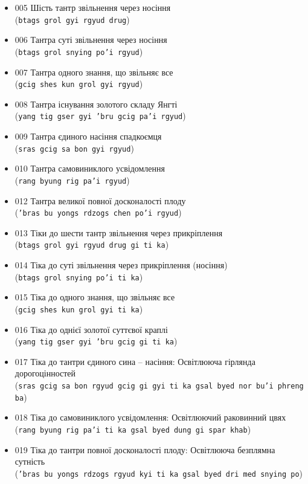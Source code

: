 \documentclass{article}
\begin{document}
\begingroup\raggedright
\begin{itemize}
\item 005 Шість тантр звільнення через носіння \\ (\texttt{btags grol gyi rgyud drug})
\item 006 Тантра суті звільнення через носіння \\ (\texttt{btags grol snying po'i rgyud})
\item 007 Тантра одного знання, що звільняє все \\ (\texttt{gcig shes kun grol gyi rgyud})
\item 008 Тантра існування золотого складу Янгті \\ (\texttt{yang tig gser gyi 'bru gcig pa'i rgyud})
\item 009 Тантра єдиного насіння спадкоємця \\ (\texttt{sras gcig sa bon gyi rgyud})
\item 010 Тантра самовиниклого усвідомлення \\ (\texttt{rang byung rig pa'i rgyud})
\item 012 Тантра великої повної досконалості плоду \\ (\texttt{'bras bu yongs rdzogs chen po'i rgyud})
\item 013 Тіки до шести тантр звільнення через прикріплення \\ (\texttt{btags grol gyi rgyud drug gi ti ka})
\item 014 Тіка до суті звільнення через прикріплення (носіння) \\ (\texttt{btags grol snying po'i ti ka})
\item 015 Тіка до одного знання, що звільняє все \\ (\texttt{gcig shes kun grol gyi ti ka})
\item 016 Тіка до однієї золотої суттєвої краплі \\ (\texttt{yang tig gser gyi 'bru gcig gi ti ka})
\item 017 Тіка до тантри єдиного сина – насіння: Освітлююча гірлянда дорогоцінностей \\ (\texttt{sras gcig sa bon rgyud gcig gi gyi ti ka gsal byed nor bu'i phreng ba})
\item 018 Тіка до самовиниклого усвідомлення: Освітлюючий раковинний цвях \\ (\texttt{rang byung rig pa'i ti ka gsal byed dung gi spar khab})
\item 019 Тіка до тантри повної досконалості плоду: Освітлююча безплямна сутність \\ (\texttt{'bras bu yongs rdzogs rgyud kyi ti ka gsal byed dri med snying po})
\end{itemize}
\endgroup
\end{document}
